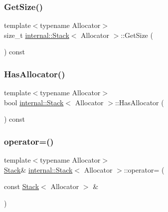 \mbox{\label{classinternal_1_1Stack_ac484468a2791bd3e9ba609bd1600ab48}} 
\subsubsection{\texorpdfstring{Get\+Size()}{GetSize()}}
{\footnotesize\ttfamily template$<$typename Allocator$>$ \\
size\+\_\+t \hyperlink{classinternal_1_1Stack}{internal\+::\+Stack}$<$ Allocator $>$\+::Get\+Size (\begin{DoxyParamCaption}{ }\end{DoxyParamCaption}) const\hspace{0.3cm}{\ttfamily [inline]}}

\mbox{\label{classinternal_1_1Stack_a657ae4d477b25d4e0045aee0efd809c3}} 
\subsubsection{\texorpdfstring{Has\+Allocator()}{HasAllocator()}}
{\footnotesize\ttfamily template$<$typename Allocator$>$ \\
bool \hyperlink{classinternal_1_1Stack}{internal\+::\+Stack}$<$ Allocator $>$\+::Has\+Allocator (\begin{DoxyParamCaption}{ }\end{DoxyParamCaption}) const\hspace{0.3cm}{\ttfamily [inline]}}

\mbox{\label{classinternal_1_1Stack_ae21d491cc0c4a22a2c131d88c0a37ae1}} 
\subsubsection{\texorpdfstring{operator=()}{operator=()}}
{\footnotesize\ttfamily template$<$typename Allocator$>$ \\
\hyperlink{classinternal_1_1Stack}{Stack}\& \hyperlink{classinternal_1_1Stack}{internal\+::\+Stack}$<$ Allocator $>$\+::operator= (\begin{DoxyParamCaption}\item[{const \hyperlink{classinternal_1_1Stack}{Stack}$<$ Allocator $>$ \&}]{ }\end{DoxyParamCaption})\hspace{0.3cm}{\ttfamily [private]}}

